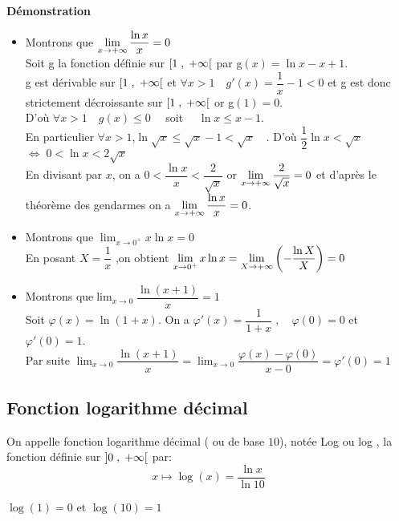 \textbf{Démonstration}
\begin{itemize}
\item   Montrons que $ \displaystyle\lim_{x \to +\infty}\dfrac{\ln x}{x}=0 $  \\  
 Soit  g la fonction définie sur $ \left[1 \;,\; +\infty\right[ $ \; par\;  g$ (x)=\ln x- x+1 $.\\ g est dérivable sur $ \left[1 \;,\; +\infty\right[ $\; et                                     \;  $ \forall x> 1  \quad g'(x)=\dfrac{1}{x}-1< 0 $\; et g est donc strictement  décroissante sur  $ \left[1 \;,\; +\infty\right[ $\; or\;  g$ (1)=0 $.\\ 
 D'où \;$\forall x> 1\quad g(x)\leq  0 \quad$\; soit \; $\quad \ln x \leq x-1 $.\\
 En particulier \; $ \forall x> 1 $,\quad  $ \ln \sqrt{x} \leq \sqrt{x}-1 <\sqrt{x}\quad$. D'où \;$\dfrac{1}{2}\ln x <\sqrt{x}$ \;$ \Leftrightarrow \;0< \ln x <2\sqrt{x}$\\
 En divisant par $ x $, on a \;$ 0< \dfrac{\ln x}{x} < \dfrac{2}{\sqrt{x}}$\; or $ \displaystyle\lim_{x \to +\infty }\dfrac{2}{\sqrt{x}}=0 $  et d'après le théorème des gendarmes on a $ \displaystyle\lim_{x \to +\infty}\dfrac{\ln x}{x}=0 $.\\
 
\item  Montrons que\; $ \displaystyle\lim_{x \to 0^{+}}x\ln x=0 $\\
 En posant $ X=\dfrac{1}{x} $ ,\;on obtient $ \displaystyle\lim_{x \to 0^{+}}x\ln x  =\displaystyle\lim_{X \to +\infty}\left(-\dfrac{\ln X}{X}\right) =0 $
 
 \item  Montrons que\;$ \displaystyle\lim_{x \to 0} \dfrac{\ln(x+1)}{x}=1 $\\
  Soit $ \varphi (x)=\ln (1+x)$.\; On a \; $ \varphi'(x)=\dfrac{1}{1+x} \;,\quad  \varphi(0)=0 $ \;et \; $ \varphi'(0)=1 $.\\
Par suite \quad   $\displaystyle \lim_{x \to 0}  \dfrac{\ln(x+1)}{x} =\displaystyle\lim_{x \to 0}  \dfrac{\varphi(x)-\varphi(0)}{x-0} = \varphi'(0)=1$
\end{itemize}


\subsection{Fonction logarithme décimal}
\begin{definition}
On appelle fonction logarithme décimal ( ou  de base $ 10 $), notée Log ou log , la  fonction définie  sur $ \left]0 \;,\; +\infty\right[ $ par: $$ x  \longmapsto \log(x)=\dfrac{\ln x}{\ln 10} $$
\end{definition}


\begin{remark}
$ \log(1)=0 $ et $ \log(10)=1 $

\end{remark}

 


